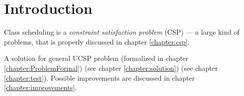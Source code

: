 \documentclass[ThesisDoc]{subfiles}
\begin{document}
\chapter{Introduction}

\todo

\medskip

Class scheduling is a \emph{constraint satisfaction problem} (CSP) ---
a large kind of problems, that is properly discussed in chapter \ref{chapter:csp}.

\medskip

\noindent
A solution for general UCSP problem
(formalized in chapter \ref{chapter:ProblemFormal}) 
(see chapter \ref{chapter:solution})  (see chapter \ref{chapter:test}).
Possible improvements are discussed in chapter \ref{chapter:improvements}.
\end{document}
